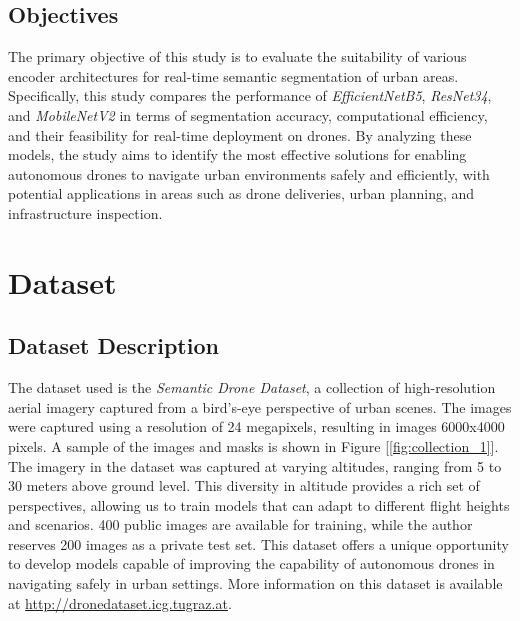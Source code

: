 \documentclass[a4paper]{article}
\begin{document}
\subsection{Objectives}
The primary objective of this study is to evaluate the suitability of various encoder architectures for real-time semantic segmentation of urban areas. Specifically, this study compares the performance of \textit{EfficientNetB5}, \textit{ResNet34}, and \textit{MobileNetV2} in terms of segmentation accuracy, computational efficiency, and their feasibility for real-time deployment on drones. By analyzing these models, the study aims to identify the most effective solutions for enabling autonomous drones to navigate urban environments safely and efficiently, with potential applications in areas such as drone deliveries, urban planning, and infrastructure inspection. 

\section{Dataset}
\subsection{Dataset Description}
The dataset used is the \textit{Semantic Drone Dataset}, a collection of high-resolution aerial imagery captured from a bird's-eye perspective of urban scenes. The images were captured using a resolution of 24 megapixels, resulting in images 6000x4000 pixels. A sample of the images and masks is shown in Figure [\ref{fig:collection_1}]. The imagery in the dataset was captured at varying altitudes, ranging from 5 to 30 meters above ground level. This diversity in altitude provides a rich set of perspectives, allowing us to train models that can adapt to different flight heights and scenarios. 400 public images are available for training, while the author reserves 200 images as a private test set. This dataset offers a unique opportunity to develop models capable of improving the capability of autonomous drones in navigating safely in urban settings. More information on this dataset is available at \url{http://dronedataset.icg.tugraz.at}. 
\end{document}
